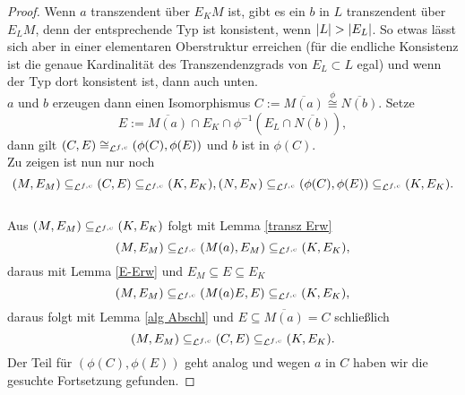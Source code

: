 \begin{proof}
    	Wenn $a$ transzendent über $E_KM$ ist, gibt es ein $b$ in $L$ transzendent über $E_LM$, denn der entsprechende Typ ist konsistent, wenn ${\left| L \right|}>{\left| E_L \right|}$. So etwas lässt sich aber in einer elementaren Oberstruktur erreichen (für die endliche Konsistenz ist die genaue Kardinalität des Transzendenzgrads von $E_L\subset L$ egal) und wenn der Typ dort konsistent ist, dann auch unten.\\
    	$a$ und $b$ erzeugen dann einen Isomorphismus $C:=\overline{M(a)}\overset{\phi}{\cong}\overline{N(b)}$. Setze $$E:=\overline{M(a)}\cap E_K\cap\phi^{-1}(E_L\cap\overline{N(b)}),$$ dann gilt $(C,E)\cong_{\mathcal{L}^{f,c}}(\phi(C),\phi(E))$ und $b$ ist in $\phi(C)$.\\
    	Zu zeigen ist nun nur noch $$(M,E_M)\subseteq_{\mathcal{L}^{f,c}}(C,E)\subseteq_{\mathcal{L}^{f,c}}(K,E_K),(N,E_N)\subseteq_{\mathcal{L}^{f,c}}(\phi(C),\phi(E))\subseteq_{\mathcal{L}^{f,c}}(K,E_K).$$\\
    	Aus $(M,E_M)\subseteq_{\mathcal{L}^{f,c}}(K,E_K)$ folgt mit Lemma \ref{transz Erw} $$(M,E_M)\subseteq_{\mathcal{L}^{f,c}}(M(a),E_M)\subseteq_{\mathcal{L}^{f,c}}(K,E_K),$$ daraus mit Lemma \ref{E-Erw} und $E_M\subseteq E\subseteq E_K$ $$(M,E_M)\subseteq_{\mathcal{L}^{f,c}}(M(a)E,E)\subseteq_{\mathcal{L}^{f,c}}(K,E_K),$$ daraus folgt mit Lemma \ref{alg Abschl} und $E\subseteq\overline{M(a)}=C$ schließlich $$(M,E_M)\subseteq_{\mathcal{L}^{f,c}}(C,E)\subseteq_{\mathcal{L}^{f,c}}(K,E_K).$$
    	Der Teil für $(\phi(C),\phi(E))$ geht analog und wegen $a$ in $C$ haben wir die gesuchte Fortsetzung gefunden.
    \end{proof}
    
    \newpage
    
